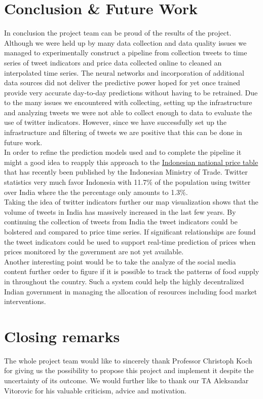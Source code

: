 \section*{Conclusion \& Future Work}
In conclusion the project team can be proud of the results of the project. Although we were held up by many data collection and data quality issues we managed to experimentally construct a pipeline from collection tweets to time series of tweet indicators and price data collected online to cleaned an interpolated time series. The neural networks and incorporation of additional data sources did not deliver the predictive power hoped for yet once trained provide very accurate day-to-day predictions without having to be retrained. Due to the many issues we encountered with collecting, setting up the infrastructure and analyzing tweets we were not able to collect enough to data to evaluate the use of twitter indicators. However, since we have successfully set up the infrastructure and filtering of tweets we are positive that this can be done in future work.\\
In order to refine the prediction models used and to complete the pipeline it might a good idea to reapply this approach to the \href{http://www.kemendag.go.id/en/economic-profile/prices/national-price-table}{Indonesian national price table} that has recently been published by the Indonesian Ministry of Trade. Twitter statistics very much favor Indonesia with 11.7\% of the population using twitter over India where the the percentage only amounts to 1.3\%.\\
Taking the idea of twitter indicators further our map visualization shows that the volume of tweets in India has massively increased in the last few years. By continuing the collection of tweets from India the tweet indicators could be bolstered and compared to price time series. If significant relationships are found the tweet indicators could be used to support real-time prediction of prices when prices monitored by the government are not yet available.\\
Another interesting point would be to take the analyze of the social media content further order to figure if it is possible to track the patterns of food supply in throughout the country. Such a system could help the highly decentralized Indian government in managing the allocation of resources including food market interventions.

\section*{Closing remarks}
The whole project team would like to sincerely thank Professor Christoph Koch for giving us the possibility to propose this project and implement it despite the uncertainty of its outcome. We would further like to thank our TA Aleksandar Vitorovic for his valuable criticism, advice and motivation.
